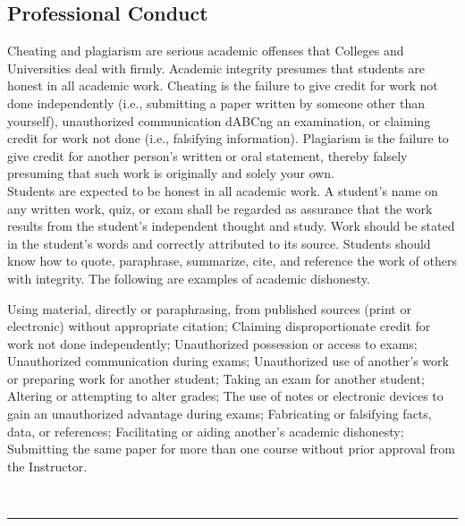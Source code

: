 \subsection*{Professional Conduct}
Cheating and plagiarism are serious academic offenses that Colleges and Universities deal with firmly. Academic integrity presumes that students are honest in all academic work. Cheating is the failure to give credit for work not done independently (i.e., submitting a paper written by someone other than yourself), unauthorized communication dABCng an examination, or claiming credit for work not done (i.e., falsifying information). Plagiarism is the failure to give credit for another person’s written or oral statement, thereby falsely presuming that such work is originally and solely your own. \\

Students are expected to be honest in all academic work. A student’s name on any written work, quiz, or exam shall be regarded as assurance that the work results from the student’s independent thought and study. Work should be stated in the student’s words and correctly attributed to its source. Students should know how to quote, paraphrase, summarize, cite, and reference the work of others with integrity. The following are examples of academic dishonesty.
\begin{outline}
    \1	Using material, directly or paraphrasing, from published sources (print or electronic) without appropriate citation;
    \1	Claiming disproportionate credit for work not done independently;
    \1	Unauthorized possession or access to exams;
    \1	Unauthorized communication during exams;
    \1	Unauthorized use of another’s work or preparing work for another student;
    \1	Taking an exam for another student;
    \1	Altering or attempting to alter grades;
    \1	The use of notes or electronic devices to gain an unauthorized advantage during exams;
    \1	Fabricating or falsifying facts, data, or references;
    \1	Facilitating or aiding another’s academic dishonesty;
    \1	Submitting the same paper for more than one course without prior approval from the Instructor.
\end{outline}

\\

\vspace{2ex}\hrule\vspace{2ex}